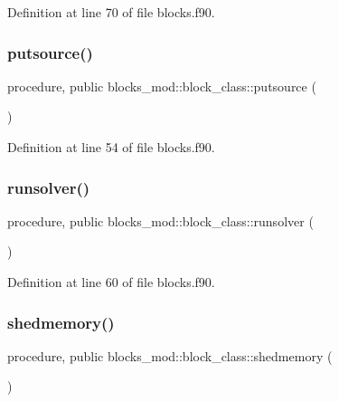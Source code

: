 Definition at line 70 of file blocks.\+f90.

\mbox{\label{structblocks__mod_1_1block__class_ac79980e841902691a06212dce50f6331}} 
\subsubsection{\texorpdfstring{putsource()}{putsource()}}
{\footnotesize\ttfamily procedure, public blocks\+\_\+mod\+::block\+\_\+class\+::putsource (\begin{DoxyParamCaption}{ }\end{DoxyParamCaption})}



Definition at line 54 of file blocks.\+f90.

\mbox{\label{structblocks__mod_1_1block__class_abe738c65f3fecf013c3884275a3fe7e4}} 
\subsubsection{\texorpdfstring{runsolver()}{runsolver()}}
{\footnotesize\ttfamily procedure, public blocks\+\_\+mod\+::block\+\_\+class\+::runsolver (\begin{DoxyParamCaption}{ }\end{DoxyParamCaption})}



Definition at line 60 of file blocks.\+f90.

\mbox{\label{structblocks__mod_1_1block__class_a2e0c6452c90707a798ba55efaba43121}} 
\subsubsection{\texorpdfstring{shedmemory()}{shedmemory()}}
{\footnotesize\ttfamily procedure, public blocks\+\_\+mod\+::block\+\_\+class\+::shedmemory (\begin{DoxyParamCaption}{ }\end{DoxyParamCaption})}



